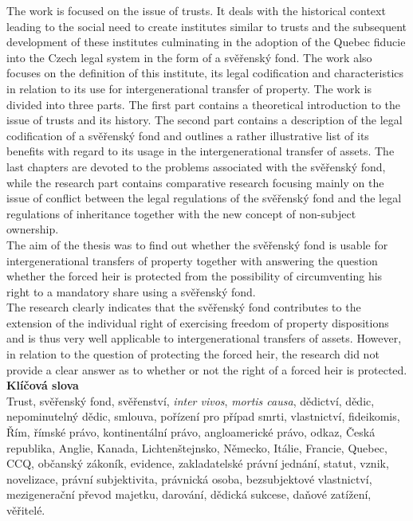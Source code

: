 \documentclass{article}
\begin{document}
\begin{center}
			The work is focused on the issue of trusts. It deals with the historical context leading to the social need to create institutes similar to trusts and the subsequent development of these institutes culminating in the adoption of the Quebec fiducie into the Czech legal system in the form of a svěřenský fond. The work also focuses on the definition of this institute, its legal codification and characteristics in relation to its use for intergenerational transfer of property. The work is divided into three parts. The first part contains a theoretical introduction to the issue of trusts and its history. The second part contains a description of the legal codification of a svěřenský fond and outlines a rather illustrative list of its benefits with regard to its usage in the intergenerational transfer of assets. The last chapters are devoted to the problems associated with the svěřenský fond, while the research part contains comparative research focusing mainly on the issue of conflict between the legal regulations of the svěřenský fond and the legal regulations of inheritance together with the new concept of non-subject ownership.\\
			\vspace*{5mm}
			The aim of the thesis was to find out whether the svěřenský fond is usable for intergenerational transfers of property together with answering the question whether the forced heir is protected from the possibility of circumventing his right to a mandatory share using a svěřenský fond.\\
			\vspace*{5mm}
			The research clearly indicates that the svěřenský fond contributes to the extension of the individual right of exercising freedom of property dispositions and is thus very well applicable to intergenerational transfers of assets. However, in relation to the question of protecting the forced heir, the research did not provide a clear answer as to whether or not the right of a forced heir is protected.\\
		\vspace*{10mm}
		\textbf{\Large Klíčová slova}\\
			\vspace*{5mm}
			Trust, svěřenský fond, svěřenství, \textit{inter vivos}, \textit{mortis causa}, dědictví, dědic, nepominutelný dědic, smlouva, pořízení pro případ smrti, vlastnictví, fideikomis, Řím, římské právo, kontinentální právo, angloamerické právo, odkaz, Česká republika, Anglie, Kanada, Lichtenštejnsko, Německo, Itálie, Francie, Quebec, CCQ, občanský zákoník, evidence, zakladatelské právní jednání, statut, vznik, novelizace, právní subjektivita, právnická osoba, bezsubjektové vlastnictví, mezigenerační převod majetku, darování, dědická sukcese, daňové zatížení, věřitelé.
	\end{center}
\end{document}
